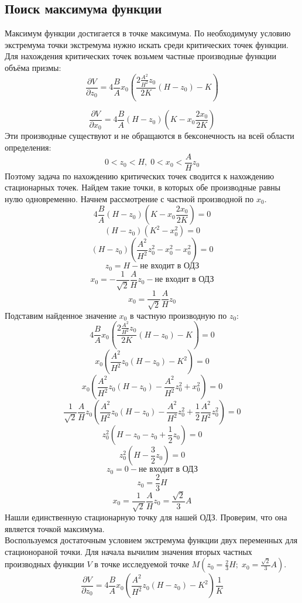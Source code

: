 \subsection{Поиск максимума функции}
Максимум функции достигается в точке максимума. По необходимуму условию экстремума точки экстремума нужно искать среди критических точек функции. Для нахождения критических точек возьмем частные производные функции объёма призмы:
$$
\frac{\partial V}{\partial z_0} = 4\frac{B}{A} x_0 
\left( 
\frac{2\frac{A^2}{H^2}z_0}{2K} (H-z_0) - K
\right) 
$$

$$
\frac{\partial V}{\partial x_0} = 4\frac{B}{A} (H-z_0) 
\left( 
K - x_0 \frac{2x_0}{2K}
\right) 
$$
Эти производные существуют и не обращаются в бексонечность на всей области определения:
$$
0 < z_0 < H, \; 0 < x_0 < \frac{A}{H}z_0
$$
Поэтому задача по нахождению критических точек сводится к нахождению стационарных точек. Найдем такие точки, в которых обе производные равны нулю одновременно. Начнем рассмотрение с частной производной по $x_0$.
$$
4\frac{B}{A} (H-z_0) 
\left( 
K - x_0 \frac{2x_0}{2K}
\right) = 0
$$
$$
(H-z_0) 
\left( 
K^2 - x_0^2
\right) = 0
$$
$$
(H-z_0) 
\left( 
\frac{A^2}{H^2} z_0^2 - x_0^2 - x_0^2
\right) = 0
$$
$$
z_0 = H - \text{не входит в ОДЗ}
$$
$$
x_0 = - \frac{1}{\sqrt{2}}\frac{A}{H}z_0 - \text{не входит в ОДЗ}
$$
$$
x_0 = \frac{1}{\sqrt{2}}\frac{A}{H}z_0
$$
Подставим найденное значение $x_0$ в частную производную по $z_0$:
$$
4\frac{B}{A} x_0 
\left( 
\frac{2\frac{A^2}{H^2}z_0}{2K} (H-z_0) - K
\right) = 0
$$
$$
x_0 
\left( 
\frac{A^2}{H^2}z_0 (H-z_0) - K^2
\right) = 0
$$
$$
x_0 
\left( 
\frac{A^2}{H^2}z_0 (H-z_0) - \frac{A^2}{H^2} z_0^2 + x_0^2
\right) = 0
$$
$$
\frac{1}{\sqrt{2}}\frac{A}{H}z_0 
\left( 
\frac{A^2}{H^2}z_0 (H-z_0) - \frac{A^2}{H^2} z_0^2 + \frac{1}{2}\frac{A^2}{H^2}z_0^2
\right) = 0
$$
$$
z_0^2
\left( 
H-z_0 - z_0 + \frac{1}{2}z_0
\right) = 0
$$
$$
z_0^2
\left( 
H - \frac{3}{2}z_0
\right) = 0
$$
$$
z_0 = 0 - \text{не входит в ОДЗ}
$$
$$
z_0 = \frac{2}{3}H
$$
$$
x_0 = \frac{1}{\sqrt{2}}\frac{A}{H} z_0 = \frac{\sqrt{2}}{3}A
$$
Нашли единственную стационарную точку для нашей ОДЗ. Проверим, что она является точкой максимума.\\
Воспользуемся достаточным условием экстремума функции двух переменных для стационораной точки. Для начала вычилим значения вторых частных производных функции $V$ в точке исследуемой точке $M(z_0 = \frac{2}{3}H; \; x_0 = \frac{\sqrt{2}}{3}A)$.
$$
\frac{\partial V}{\partial z_0} = 4\frac{B}{A} x_0 
\left( 
\frac{A^2}{H^2}z_0 (H-z_0) - K^2
\right) \frac{1}{K}
$$

